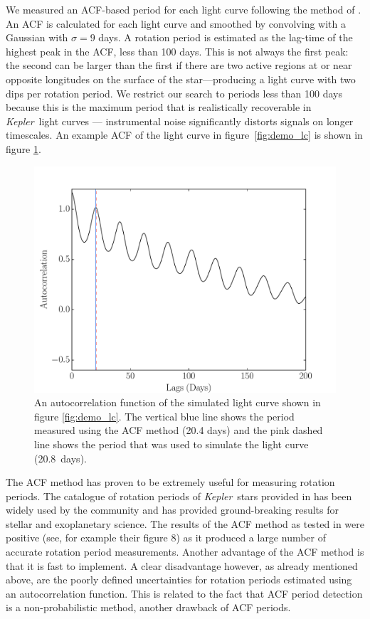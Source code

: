 \documentclass[useAMS, usenatbib, preprint, 12pt]{aastex}
\newcommand{\Kepler}{{\it Kepler}}
\newcommand{\kepler}{\Kepler}
\newcommand{\aigrainexampleperiod}{20.8}
\begin{document}
We measured an ACF-based period for each light curve following the method of
\citet{Mcquillan2013}.
An ACF is calculated for each light curve and smoothed by convolving with a
Gaussian with $\sigma=9$ days.
A rotation period is estimated as the lag-time of the highest peak in the ACF,
less than 100 days.
This is not always the first peak: the second can be larger than the first if
there are two active regions at or near opposite longitudes on the surface of
the star---producing a light curve with two dips per rotation period.
We restrict our search to periods less than 100 days because this is the
maximum period that is realistically recoverable in \kepler\ light curves ---
instrumental noise significantly distorts signals on longer timescales.
An example ACF of the light curve in figure~\ref{fig:demo_lc} is shown
in figure \ref{fig:demo_acf}.

\begin{figure}
\begin{center}
\includegraphics[width=6in, clip=true]{figures/demo_ACF.pdf}
\caption[ACF of a simulated light curve.]
{An autocorrelation function of the simulated light curve shown in figure
\ref{fig:demo_lc}.
The vertical blue line shows the period measured using the ACF method (20.4
days) and the pink dashed line shows the period that was used to simulate the
light curve (\aigrainexampleperiod\ days).}
\label{fig:demo_acf}
\end{center}
\end{figure}

The ACF method has proven to be extremely useful for measuring rotation
periods.
The catalogue of rotation periods of \Kepler\ stars provided in
\citet{Mcquillan2013} has been widely used by the community and has provided
ground-breaking results for stellar and exoplanetary science.
The results of the ACF method as tested in \citet{Aigrain2015} were positive
(see, for example their figure 8) as it produced a large number of accurate
rotation period measurements.
Another advantage of the ACF method is that it is fast to implement.
A clear disadvantage however, as already mentioned above, are the poorly
defined uncertainties for rotation periods estimated using an autocorrelation
function.
This is related to the fact that ACF period detection is a non-probabilistic
method, another drawback of ACF periods.
\end{document}
